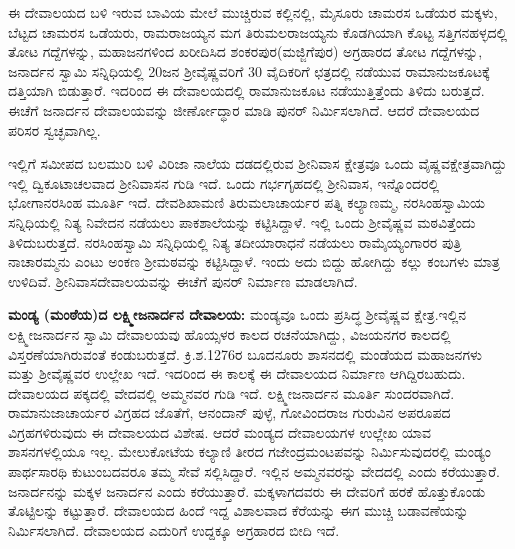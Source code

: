 ಈ ದೇವಾಲಯದ ಬಳಿ ಇರುವ ಬಾವಿಯ ಮೇಲೆ ಮುಚ್ಚಿರುವ ಕಲ್ಲಿನಲ್ಲಿ, ಮೈಸೂರು ಚಾಮರಸ ಒಡೆಯರ ಮಕ್ಕಳು, ಬೆಟ್ಟದ ಚಾಮರಸ ಒಡೆಯರು, ರಾಮರಾಜಯ್ಯನ ಮಗ ತಿರುಮಲರಾಜಯ್ಯನು ಕೊಡಗಿಯಾಗಿ ಕೊಟ್ಟ ಸತ್ತಿಗನಹಳ್ಳದಲ್ಲಿ ತೋಟ ಗದ್ದೆಗಳನ್ನು, ಮಹಾಜನಗಳಿಂದ ಖರೀದಿಸಿದ ಶಂಕರಪುರ(ಮಜ್ಜಿಗೆಪುರ) ಅಗ್ರಹಾರದ ತೋಟ ಗದ್ದೆಗಳನ್ನು, ಜನಾರ್ದನ ಸ್ವಾಮಿ ಸನ್ನಿಧಿಯಲ್ಲಿ 20ಜನ ಶ‍್ರೀವೈಷ್ಣವರಿಗೆ 30 ವೈದಿಕರಿಗೆ ಛತ್ರದಲ್ಲಿ ನಡೆಯುವ ರಾಮಾನುಜಕೂಟಕ್ಕೆ ದತ್ತಿಯಾಗಿ ಬಿಡುತ್ತಾರೆ. ಇದರಿಂದ ಈ ದೇವಾಲಯದಲ್ಲಿ ರಾಮಾನುಜಕೂಟ ನಡೆಯುತ್ತಿತ್ತೆಂದು ತಿಳಿದು ಬರುತ್ತದೆ. ಈಚೆಗೆ ಜನಾರ್ದನ ದೇವಾಲಯವನ್ನು ಜೀರ್ಣೋದ್ಧಾರ ಮಾಡಿ ಪುನರ್ ನಿರ್ಮಿಸಲಾಗಿದೆ. ಆದರೆ ದೇವಾಲಯದ ಪರಿಸರ ಸ್ವಚ್ಛವಾಗಿಲ್ಲ.

ಇಲ್ಲಿಗೆ ಸಮೀಪದ ಬಲಮುರಿ ಬಳಿ ವಿರಿಜಾ ನಾಲೆಯ ದಡದಲ್ಲಿರುವ ಶ‍್ರೀನಿವಾಸ ಕ್ಷೇತ್ರವೂ ಒಂದು ವೈಷ್ಣವಕ್ಷೇತ್ರ\-ವಾಗಿದ್ದು ಇಲ್ಲಿ ದ್ವಿಕೂಟಾಚಲವಾದ ಶ‍್ರೀನಿವಾಸನ ಗುಡಿ ಇದೆ. ಒಂದು ಗರ್ಭಗೃಹದಲ್ಲಿ ಶ‍್ರೀನಿವಾಸ, ಇನ್ನೊಂದರಲ್ಲಿ ಭೋಗಾನರಸಿಂಹ ಮೂರ್ತಿ ಇದೆ. ದೇವಶಿಖಾಮಣಿ ತಿರುಮಲಾಚಾರ್ಯರ ಪತ್ನಿ ಕಲ್ಯಾಣಮ್ಮ, ನರಸಿಂಹಸ್ವಾಮಿಯ ಸನ್ನಿಧಿಯಲ್ಲಿ ನಿತ್ಯ ನಿವೇದನ ನಡೆಯಲು ಪಾಕಶಾಲೆಯನ್ನು ಕಟ್ಟಿಸಿದ್ದಾಳೆ. ಇಲ್ಲಿ ಒಂದು ಶ‍್ರೀವೈಷ್ಣವ ಮಠವಿತ್ತೆಂದು ತಿಳಿದುಬರುತ್ತದೆ. ನರಸಿಂಹಸ್ವಾಮಿ ಸನ್ನಿಧಿಯಲ್ಲಿ ನಿತ್ಯ ತದೀಯಾರಾಧನೆ ನಡೆಯಲು ರಾಮೈಯ್ಯಂಗಾರರ ಪುತ್ರಿ ನಾಚಾರಮ್ಮನು ಎಂಟು ಅಂಕಣ ಶ‍್ರೀಮಠವನ್ನು ಕಟ್ಟಿಸಿದ್ದಾಳೆ. ಇಂದು ಅದು ಬಿದ್ದು ಹೋಗಿದ್ದು ಕಲ್ಲು ಕಂಬಗಳು ಮಾತ್ರ ಉಳಿದಿವೆ. ಶ‍್ರೀನಿವಾಸದೇವಾಲಯವನ್ನು ಈಚೆಗೆ ಪುನರ್​ ನಿರ್ಮಾಣ ಮಾಡಲಾಗಿದೆ.

\vskip 3pt

\textbf{ಮಂಡ್ಯ (ಮಂಠೆಯ)ದ ಲಕ್ಷ್ಮೀಜನಾರ್ದನ ದೇವಾಲಯ:} ಮಂಡ್ಯವೂ ಒಂದು ಪ್ರಸಿದ್ಧ ಶ‍್ರೀವೈಷ್ಣವ ಕ್ಷೇತ್ರ.\break ಇಲ್ಲಿನ ಲಕ್ಷ್ಮೀಜನಾರ್ದನ ಸ್ವಾಮಿ ದೇವಾಲಯವು ಹೊಯ್ಸಳರ ಕಾಲದ ರಚನೆಯಾಗಿದ್ದು, ವಿಜಯನಗರ ಕಾಲದಲ್ಲಿ ವಿಸ್ತರಣೆ\-ಯಾಗಿರು\-ವಂತೆ ಕಂಡುಬರುತ್ತದೆ. ಕ್ರಿ.ಶ.1276ರ ಬೂದನೂರು ಶಾಸನದಲ್ಲಿ ಮಂಡೆಯದ ಮಹಾಜನಗಳು ಮತ್ತು ಶ‍್ರೀವೈಷ್ಣವರ ಉಲ್ಲೇಖ ಇದೆ. ಇದರಿಂದ ಈ ಕಾಲಕ್ಕೆ ಈ ದೇವಾಲಯದ ನಿರ್ಮಾಣ ಆಗಿದ್ದಿರಬಹುದು. ದೇವಾಲಯದ ಪಕ್ಕದಲ್ಲಿ ವೇದವಲ್ಲಿ ಅಮ್ಮನವರ ಗುಡಿ ಇದೆ. ಲಕ್ಷ್ಮೀಜನಾರ್ದನ ಮೂರ್ತಿ ಸುಂದರವಾಗಿದೆ. ರಾಮಾನುಜಾಚಾರ್ಯರ ವಿಗ್ರಹದ ಜೊತೆಗೆ, ಆನಂದಾನ್​ ಪುಳ್ಳೆ, ಗೋವಿಂದರಾಜ ಗುರುವಿನ ಅಪರೂಪದ ವಿಗ್ರಹಗಳಿರುವುದು ಈ ದೇವಾಲಯದ ವಿಶೇಷ. ಆದರೆ ಮಂಡ್ಯದ ದೇವಾಲಯಗಳ ಉಲ್ಲೇಖ ಯಾವ ಶಾಸನಗಳಲ್ಲಿಯೂ ಇಲ್ಲ. ಮೇಲುಕೋಟೆಯ ಕಲ್ಯಾಣಿ ತೀರದ ಗಜೇಂದ್ರಮಂಟಪವನ್ನು ನಿರ್ಮಿಸುವುದರಲ್ಲಿ ಮಂಡ್ಯಂ ಪಾರ್ಥಸಾರಥಿ ಕುಟುಂಬದವರೂ ತಮ್ಮ ಸೇವೆ ಸಲ್ಲಿಸಿದ್ದಾರೆ. ಇಲ್ಲಿನ ಅಮ್ಮನವರನ್ನು ವೇದದಲ್ಲಿ ಎಂದು ಕರೆಯುತ್ತಾರೆ. ಜನಾರ್ದನನ್ನು ಮಕ್ಕಳ ಜನಾರ್ದನ ಎಂದು ಕರೆಯುತ್ತಾರೆ. ಮಕ್ಕಳಾಗದವರು ಈ ದೇವರಿಗೆ ಹರಕೆ ಹೊತ್ತುಕೊಂಡು ತೊಟ್ಟಿಲನ್ನು ಕಟ್ಟುತ್ತಾರೆ. ದೇವಾಲಯದ ಹಿಂದೆ ಇದ್ದ ವಿಶಾಲವಾದ ಕೆರೆಯನ್ನು ಈಗ ಮುಚ್ಚಿ ಬಡಾವಣೆಯನ್ನು ನಿರ್ಮಿಸಲಾಗಿದೆ. ದೇವಾಲಯದ ಎದುರಿಗೆ ಉದ್ದಕ್ಕೂ ಅಗ್ರಹಾರದ ಬೀದಿ ಇದೆ.

